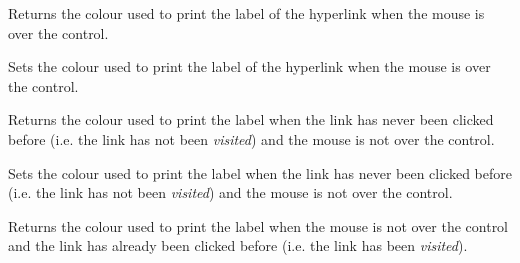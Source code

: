 






\label{wxhyperlinkctrlgethovercolour}


Returns the colour used to print the label of the hyperlink when the mouse is over the control.


\label{wxhyperlinkctrlsethovercolour}


Sets the colour used to print the label of the hyperlink when the mouse is over the control.


\label{wxhyperlinkctrlgetnormalcolour}


Returns the colour used to print the label when the link has never been clicked before
(i.e. the link has not been {\it visited}) and the mouse is not over the control.


\label{wxhyperlinkctrlsetnormalcolour}


Sets the colour used to print the label when the link has never been clicked before
(i.e. the link has not been {\it visited}) and the mouse is not over the control.


\label{wxhyperlinkctrlgetvisitedcolour}


Returns the colour used to print the label when the mouse is not over the control
and the link has already been clicked before (i.e. the link has been {\it visited}).


\label{wxhyperlinkctrlsetvisitedcolour}

